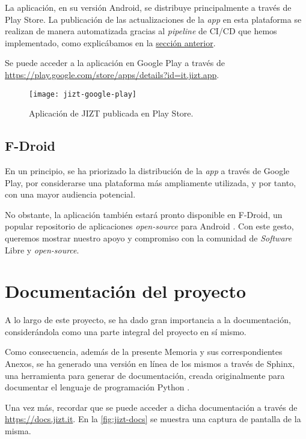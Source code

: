 La aplicación, en su versión Android, se distribuye principalmente a través de Play Store. La publicación de las actualizaciones de la \emph{app} en esta plataforma se realizan de manera automatizada gracias al \emph{pipeline} de CI/CD que hemos implementado, como explicábamos en la \hyperref[subsec:ci-cd-app]{sección anterior}. 

Se puede acceder a la aplicación en Google Play a través de \\ \href{https://play.google.com/store/apps/details?id=it.jizt.app}{https://play.google.com/store/apps/details?id=it.jizt.app}.

\begin{figure}[h]
	\centering
	\texttt{[image: jizt-google-play]}
	\caption{Aplicación de JIZT publicada en Play Store.}
\end{figure}

\newpage

\subsection{F-Droid}

En un principio, se ha priorizado la distribución de la \emph{app} a través de Google Play, por considerarse una plataforma más ampliamente utilizada, y por tanto, con una mayor audiencia potencial.

No obstante, la aplicación también estará pronto disponible en F-Droid, un popular repositorio de aplicaciones \emph{open-source} para Android \cite{f-droid}. Con este gesto, queremos mostrar nuestro apoyo y compromiso con la comunidad de \emph{Software} Libre y \emph{open-source}.


\section{Documentación del proyecto}

A lo largo de este proyecto, se ha dado gran importancia a la documentación, considerándola como una parte integral del proyecto en sí mismo.

Como consecuencia, además de la presente Memoria y sus correspondientes Anexos, se ha generado una versión en línea de los mismos a través de Sphinx, una herramienta para generar de documentación, creada originalmente para documentar el lenguaje de programación Python \cite{sphinx-doc}.

Una vez más, recordar que se puede acceder a dicha documentación a través de \href{https://docs.jizt.it}{https://docs.jizt.it}. En la \autoref{fig:jizt-docs} se muestra una captura de pantalla de la misma.

